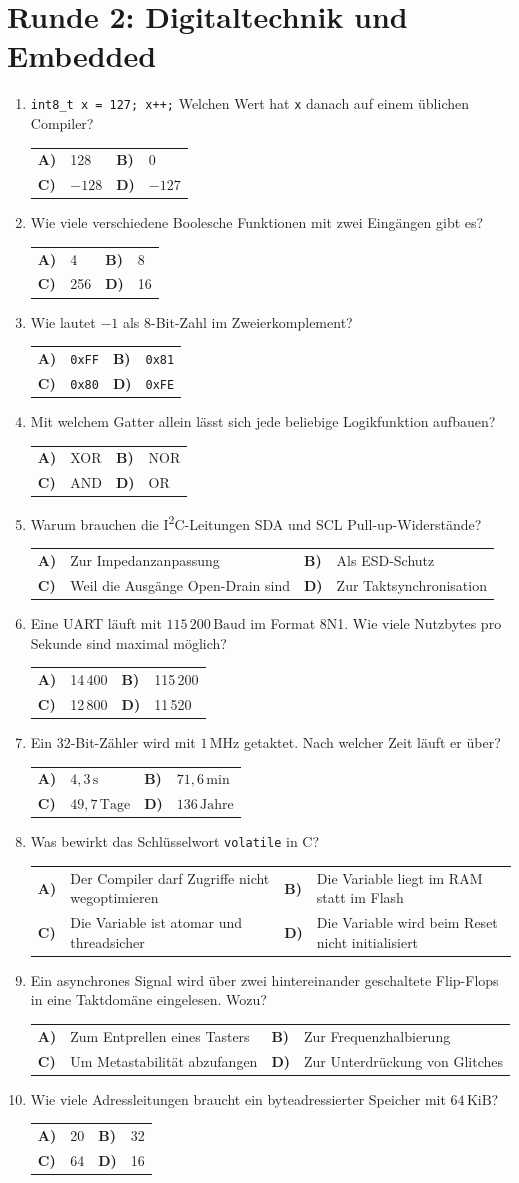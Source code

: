 \documentclass[a4paper,11pt]{article}
\makeatletter
\newif\ifloesung
\newcommand{\loesung}[1]{\ifloesung\par\smallskip\noindent\textcolor{zwetschge}{\textbf{Lösung:} #1}\fi}
\newcommand{\mc}[6]{%
  \item #1\par\nopagebreak\smallskip
  \noindent\begin{tabularx}{\linewidth}{@{}>{\bfseries}l X >{\bfseries}l X@{}}
    A) & #2 & B) & #3 \\[0.25em]
    C) & #4 & D) & #5
  \end{tabularx}%
  \loesung{#6}}
\newcommand{\runde}[2]{\section{Runde #1: #2}}
\makeatother
\begin{document}
\runde{2}{Digitaltechnik und Embedded}
\begin{enumerate}
  \mc{\texttt{int8\_t x = 127; x++;} Welchen Wert hat \texttt{x} danach auf einem üblichen Compiler?}
     {128}{0}{$-128$}{$-127$}
     {C. Überlauf im Zweierkomplement: \texttt{0x7F} $+ 1 =$ \texttt{0x80} $= -128$.}

  \mc{Wie viele verschiedene Boolesche Funktionen mit zwei Eingängen gibt es?}
     {4}{8}{256}{16}
     {D. Eine Wahrheitstabelle mit 4 Zeilen, jede Zeile 0 oder 1: $2^4 = 16$.}

  \mc{Wie lautet $-1$ als 8-Bit-Zahl im Zweierkomplement?}
     {\texttt{0xFF}}{\texttt{0x81}}{\texttt{0x80}}{\texttt{0xFE}}
     {A. Alle Bits gesetzt. \texttt{0x81} wäre $-1$ in Vorzeichen-Betrag-Darstellung.}

  \mc{Mit welchem Gatter allein lässt sich jede beliebige Logikfunktion aufbauen?}
     {XOR}{NOR}{AND}{OR}
     {B. NOR (wie NAND) ist universell.}

  \mc{Warum brauchen die I\textsuperscript{2}C-Leitungen SDA und SCL Pull-up-Widerstände?}
     {Zur Impedanzanpassung}{Als ESD-Schutz}{Weil die Ausgänge Open-Drain sind}{Zur Taktsynchronisation}
     {C. Die Teilnehmer ziehen die Leitung nur auf Low. High entsteht über den Pull-up. Das erlaubt auch Clock-Stretching und Arbitrierung.}

  \mc{Eine UART läuft mit $115\,200\,\mathrm{Baud}$ im Format 8N1. Wie viele Nutzbytes pro Sekunde sind maximal möglich?}
     {14\,400}{115\,200}{12\,800}{11\,520}
     {D. Pro Byte werden 10 Bit übertragen (Start, 8 Daten, Stopp).}

  \mc{Ein 32-Bit-Zähler wird mit $1\,\mathrm{MHz}$ getaktet. Nach welcher Zeit läuft er über?}
     {$4{,}3\,\mathrm{s}$}{$71{,}6\,\mathrm{min}$}{$49{,}7\,\mathrm{Tage}$}{$136\,\mathrm{Jahre}$}
     {B. $2^{32}\,\mathrm{\mu s} \approx 4295\,\mathrm{s}$. 49,7 Tage wären es bei einem Millisekunden-Tick (der bekannte \texttt{millis()}-Überlauf).}

  \mc{Was bewirkt das Schlüsselwort \texttt{volatile} in C?}
     {Der Compiler darf Zugriffe nicht wegoptimieren}{Die Variable liegt im RAM statt im Flash}{Die Variable ist atomar und threadsicher}{Die Variable wird beim Reset nicht initialisiert}
     {A. Jeder Zugriff wird wirklich ausgeführt (wichtig bei Registern und ISR-Variablen). Atomar wird sie dadurch nicht.}

  \mc{Ein asynchrones Signal wird über zwei hintereinander geschaltete Flip-Flops in eine Taktdomäne eingelesen. Wozu?}
     {Zum Entprellen eines Tasters}{Zur Frequenzhalbierung}{Um Metastabilität abzufangen}{Zur Unterdrückung von Glitches}
     {C. Das erste Flip-Flop darf metastabil werden. Bis zur nächsten Taktflanke hat es sich mit hoher Wahrscheinlichkeit eingeschwungen.}

  \mc{Wie viele Adressleitungen braucht ein byteadressierter Speicher mit $64\,\mathrm{KiB}$?}
     {20}{32}{64}{16}
     {D. $64 \cdot 1024 = 2^{16}$.}
\end{enumerate}
\end{document}
